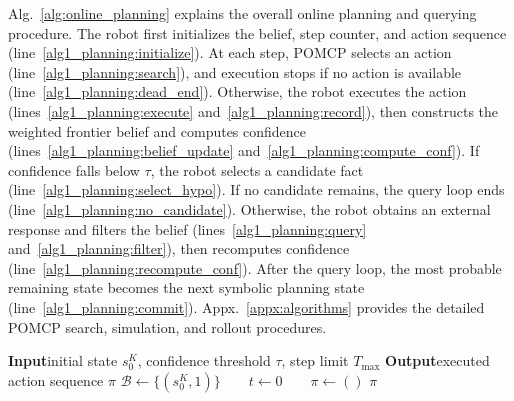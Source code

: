 Alg.~\ref{alg:online_planning} explains the overall online planning and querying procedure. The robot first initializes the belief, step counter, and action sequence (line~\ref{alg1_planning:initialize}). At each step, POMCP selects an action (line~\ref{alg1_planning:search}), and execution stops if no action is available (line~\ref{alg1_planning:dead_end}). Otherwise, the robot executes the action  (lines~\ref{alg1_planning:execute} and~\ref{alg1_planning:record}), then constructs the weighted frontier belief and computes confidence (lines~\ref{alg1_planning:belief_update} and~\ref{alg1_planning:compute_conf}). If confidence falls below $\tau$, the robot selects a candidate fact (line~\ref{alg1_planning:select_hypo}). If no candidate remains, the query loop ends (line~\ref{alg1_planning:no_candidate}). Otherwise, the robot obtains an external response and filters the belief (lines~\ref{alg1_planning:query} and~\ref{alg1_planning:filter}), then recomputes confidence (line~\ref{alg1_planning:recompute_conf}). After the query loop, the most probable remaining state becomes the next symbolic planning state (line~\ref{alg1_planning:commit}). Appx.~\ref{appx:algorithms} provides the detailed POMCP search, simulation, and rollout procedures.

\begin{algorithm}[t]
\caption{Belief-Guided State Verification and Planning}
\label{alg:online_planning}
\DontPrintSemicolon
\textbf{Input}\quad initial state $s_0^{K}$, confidence threshold $\tau$, step limit $T_{\max}$\;
\textbf{Output}\quad executed action sequence $\pi$\;
\BlankLine
$\mathcal{B}\gets\{(s_0^{K},1)\}\qquad t\gets0\qquad \pi\gets()$\label{alg1_planning:initialize}\;
\KwRet $\pi$\label{alg1_planning:return}\;
\end{algorithm}

